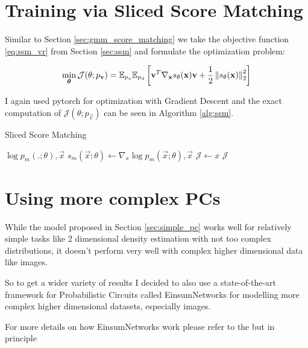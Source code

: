 \section{Training via Sliced Score Matching}

Similar to Section \ref{sec:gmm_score_matching} we take the objective function \ref{eq:ssm_vr} from Section \ref{sec:ssm} and formulate
the optimization problem:

\begin{equation}
    \min_{\substack{\boldsymbol \theta}}  \mathcal{J}(\theta; p_{\textbf{v}}) = \mathbb{E}_{p_v} \mathbb{E}_{p_d} \left[ \textbf{v}^T \nabla_{\textbf{x}} s_\theta(\textbf{x}) \textbf{v} + \frac{1}{2} \left\lVert s_\theta(\textbf{x}) \right\rVert^2_2 \right]
    \label{eq:ssm_optimization_problem}
\end{equation}

I again used pytorch for optimization with Gradient Descent and the exact computation of $\mathcal{J}(\theta; p_\vec{v})$ can be seen 
in Algorithm \ref{alg:ssm}.

\begin{algorithm}
    \caption{Sliced Score Matching}
    \label{alg:ssm}
    \begin{algorithmic}[1]  
        \Require $\log p_m(.;\theta), \vec x$
        \State $s_m(\vec x; \theta) \gets \nabla_x \log p_m(\vec x;\theta), \vec x$
        \State $\mathcal{J} \gets x$
        \State \Return $\mathcal{J}$
    \end{algorithmic}
\end{algorithm}

\section{Using more complex PCs}

While the model proposed in Section \ref{sec:simple_pc} works well for relatively simple tasks like 2 dimensional density estimation 
with not too complex distributions, it doesn't perform very well with complex higher dimensional data like images. 

So to get a wider variety of results I decided to also use a state-of-the-art framework for Probabilistic Circuits called 
EinsumNetworks \cite{einsum} for modelling more complex higher dimensional datasets, especially images. 

For more details on how EinsumNetworks work please refer to the \cite{einsum} but in principle 
